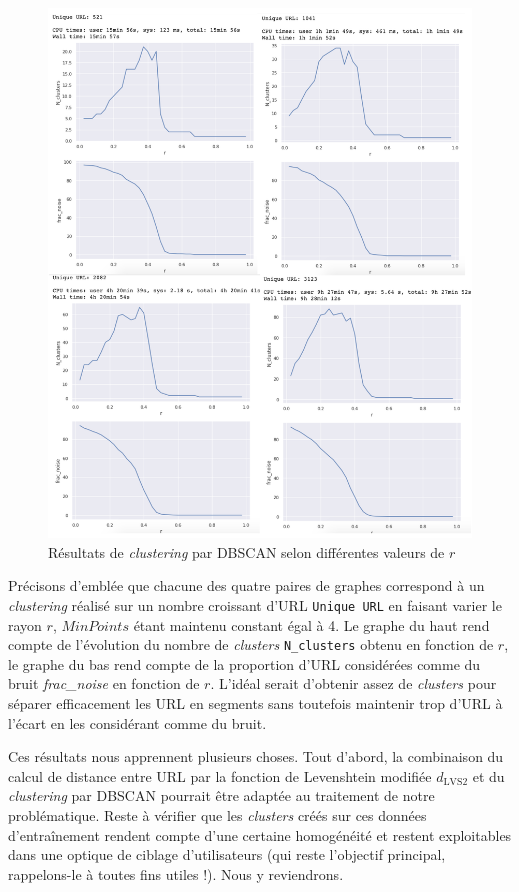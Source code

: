 \documentclass[11pt, a4paper]{article}
\begin{document}
\begin{figure}[!h]
	\center
	\includegraphics[scale=0.21]{clustering.png}
	\caption{Résultats de \textit{clustering} par DBSCAN selon différentes valeurs de $r$}
	\label{clustering}
\end{figure}

Précisons d'emblée que chacune des quatre paires de graphes correspond à un \textit{clustering} réalisé sur un nombre croissant d'URL \texttt{Unique URL} en faisant varier le rayon $r$, $MinPoints$ étant maintenu constant égal à 4. Le graphe du haut rend compte de l'évolution du nombre de \textit{clusters} \texttt{N\_clusters} obtenu en fonction de $r$, le graphe du bas rend compte de la proportion d'URL considérées comme du bruit \textit{frac\_noise} en fonction de $r$. L'idéal serait d'obtenir assez de \textit{clusters} pour séparer efficacement les URL en segments sans toutefois maintenir trop d'URL à l'écart en les considérant comme du bruit.

Ces résultats nous apprennent plusieurs choses. Tout d'abord, la combinaison du calcul de distance entre URL par la fonction de Levenshtein modifiée $d_{\text{LVS2}}$ et du \textit{clustering} par DBSCAN pourrait être adaptée au traitement de notre problématique. Reste à vérifier que les \textit{clusters} créés sur ces données d'entraînement rendent compte d'une certaine homogénéité et restent exploitables dans une optique de ciblage d'utilisateurs (qui reste l'objectif principal, rappelons-le à toutes fins utiles !). Nous y reviendrons.
\end{document}
